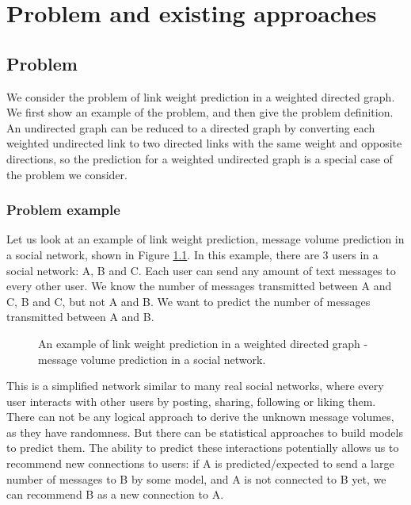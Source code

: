 \documentclass[12pt]{WSUThesis}
\theoremstyle{definition}
\begin{document}
\chapter{Problem and existing approaches}

\section{Problem}
We consider the problem of link weight prediction in a weighted directed graph.
We first show an example of the problem,
and then give the problem definition.
An undirected graph can be reduced to a directed graph by converting each weighted undirected link to two directed links with the same weight and opposite directions,
so the prediction for a weighted undirected graph is a special case of the problem we consider.

\subsection{Problem example}
Let us look at an example of link weight prediction, message volume prediction in a social network, shown in Figure \ref{fig:example}.
In this example, there are 3 users in a social network: A, B and C.
Each user can send any amount of text messages to every other user.
We know the number of messages transmitted between A and C, B and C, but not A and B.
We want to predict the number of messages transmitted between A and B.
\begin{figure}[!htb]\centering
	\caption{
		An example of link weight prediction in a weighted directed graph -
		message volume prediction in a social network.
	}
	\label{fig:example}
\end{figure}

This is a simplified network similar to many real social networks, where every user interacts with other users by posting, sharing, following or liking them.
There can not be any logical approach to derive the unknown message volumes,
as they have randomness.
But there can be statistical approaches to build models to predict them.
The ability to predict these interactions potentially allows us to recommend new connections to users:
if A is predicted/expected to send a large number of messages to B by some model,
and A is not connected to B yet,
we can recommend B as a new connection to A.
\end{document}
